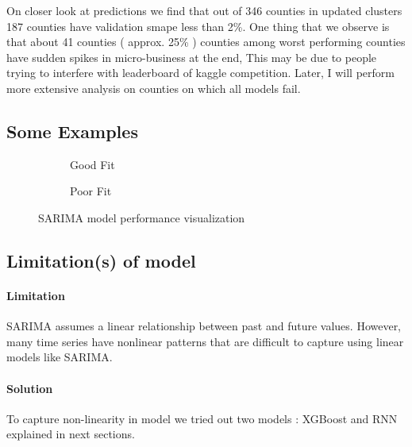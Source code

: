 \documentclass{article}
\begin{document}
On closer look at predictions we find that out of 346 counties in updated clusters 187 counties have validation smape less than 2\%. One thing that we observe is that about 41 counties ( approx. 25\% ) counties among worst performing counties have sudden spikes in micro-business at the end, This may be due to people trying to interfere with leaderboard of kaggle competition. Later, I will perform more extensive analysis on counties on which all models fail.

\vspace{1em}

\subsection{Some Examples}

\begin{figure}[h]
	\centering
	\vspace{1em}
	\begin{subfigure}{0.45\textwidth}
		\caption{Good Fit}
		\label{fig:sarima_good}
	\end{subfigure}
	\begin{subfigure}{0.45\textwidth}
		\caption{Poor Fit}
		\label{fig:sarima_poor}
	\end{subfigure}
	\caption{SARIMA model performance visualization}
	\label{fig:sarima_both}
\end{figure}


\subsection{Limitation(s)  of model}

\paragraph{Limitation} SARIMA assumes a linear relationship between past and future values. However, many time series have nonlinear patterns that are difficult to capture using linear models like SARIMA. 

\paragraph{Solution} To capture non-linearity in model we tried out two models : XGBoost and RNN explained in next sections. 
\end{document}

